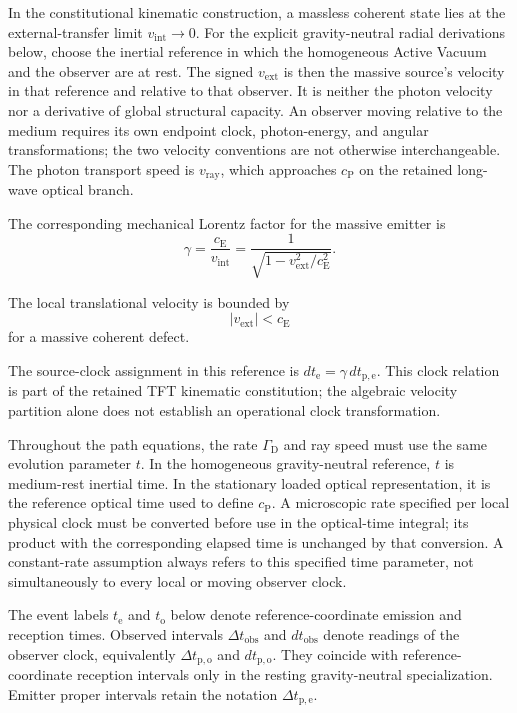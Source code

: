 In the constitutional kinematic construction, a massless coherent state lies
at the external-transfer limit \(v_{\mathrm{int}}\rightarrow0\).
For the explicit gravity-neutral radial derivations below, choose the
inertial reference in which the homogeneous Active Vacuum and the observer
are at rest. The signed \(v_{\mathrm{ext}}\) is then the massive source's
velocity in that reference and relative to that observer. It is neither the
photon velocity nor a derivative of global structural capacity. An observer
moving relative to the medium requires its own endpoint clock, photon-energy,
and angular transformations; the two velocity conventions are not otherwise
interchangeable. The photon transport speed is \(v_{\mathrm{ray}}\), which
approaches \(c_{\mathrm P}\) on the retained long-wave optical branch.

The corresponding mechanical Lorentz factor for the massive emitter is
\begin{equation}
    \boxed{
    \gamma
    =
    \frac{c_{\mathrm E}}{v_{\mathrm{int}}}
    =
    \frac{1}{
        \sqrt{
            1-v_{\mathrm{ext}}^{2}/c_{\mathrm E}^{2}
        }
    }.
    }
    \label{eq:AR_gamma}
\end{equation}

The local translational velocity is bounded by
\begin{equation}
    |v_{\mathrm{ext}}|
    <
    c_{\mathrm E}
\end{equation}
for a massive coherent defect.

The source-clock assignment in this reference is
\(dt_{\mathrm e}=\gamma\,dt_{\mathrm{p,e}}\). This clock relation is part of
the retained TFT kinematic constitution; the algebraic velocity partition
alone does not establish an operational clock transformation.

Throughout the path equations, the rate \(\Gamma_{\mathrm D}\) and ray speed
must use the same evolution parameter \(t\). In the homogeneous
gravity-neutral reference, \(t\) is medium-rest inertial time. In the
stationary loaded optical representation, it is the reference optical time
used to define \(c_{\mathrm P}\). A microscopic rate specified per local
physical clock must be converted before use in the optical-time integral;
its product with the corresponding elapsed time is unchanged by that
conversion. A constant-rate assumption always refers to this specified time
parameter, not simultaneously to every local or moving observer clock.

The event labels \(t_{\mathrm e}\) and \(t_{\mathrm o}\) below denote
reference-coordinate emission and reception times. Observed intervals
\(\Delta t_{\mathrm{obs}}\) and \(dt_{\mathrm{obs}}\) denote readings of the
observer clock, equivalently \(\Delta t_{\mathrm{p,o}}\) and
\(dt_{\mathrm{p,o}}\). They coincide with reference-coordinate reception
intervals only in the resting gravity-neutral specialization. Emitter
proper intervals retain the notation \(\Delta t_{\mathrm{p,e}}\).

